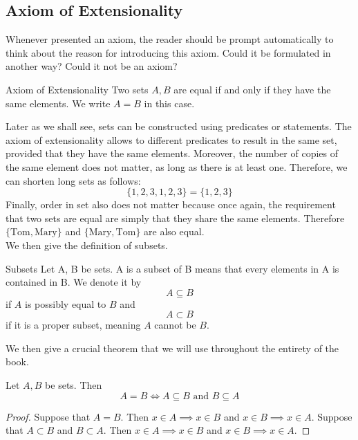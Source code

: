 \documentclass[a4paper]{article}
\begin{document}
\subsection{Axiom of Extensionality}
Whenever presented an axiom, the reader should be prompt automatically to think about the reason for introducing this axiom. Could it be formulated in another way? Could it not be an axiom? 

\begin{axm}{Axiom of Extensionality}{} Two sets $A,B$ are equal if and only if they have the same elements. We write $A=B$ in this case. 
\end{axm}

Later as we shall see, sets can be constructed using predicates or statements. The axiom of extensionality allows to different predicates to result in the same set, provided that they have the same elements. Moreover, the number of copies of the same element does not matter, as long as there is at least one. Therefore, we can shorten long sets as follows: $$\{1,2,3,1,2,3\}=\{1,2,3\}$$ Finally, order in set also does not matter because once again, the requirement that two sets are equal are simply that they share the same elements. Therefore $\{\text{Tom}, \text{Mary}\}$ and $\{\text{Mary}, \text{Tom}\}$ are also equal. \\

We then give the definition of subsets. 

\begin{defn}{Subsets}{} Let A, B be sets. A is a subset of B means that every elements in A is contained in B. We denote it by $$A\subseteq B$$ if $A$ is possibly equal to $B$ and $$A\subset B$$ if it is a proper subset, meaning $A$ cannot be $B$. 
\end{defn}

We then give a crucial theorem that we will use throughout the entirety of the book. 

\begin{thm}{}{} Let $A,B$ be sets. Then $$A=B\iff A\subseteq B\text{ and }B\subseteq A$$
\begin{proof} Suppose that $A=B$. Then $x\in A\implies x\in B$ and $x\in B\implies x\in A$. Suppose that $A\subset B$ and $B\subset A$. Then $x\in A\implies x\in B$ and $x\in B\implies x\in A$. 
\end{proof}
\end{thm}
\end{document}
